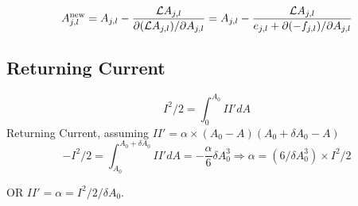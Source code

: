 \documentclass[aps,prd,preprint,groupedaddress]{revtex4-1}
\def\nn{\nonumber}
\def\beq{\begin{equation}}
\def\eeq{\end{equation}}
\def\WH{\Omega_{\rm H}}
\begin{document}
\beq
A_{j,l}^{\rm new }
= A_{j,l} - \frac{\mathcal L A_{j,l}}{\partial (\mathcal L A_{j,l})/\partial A_{j,l} }
= A_{j,l} - \frac{\mathcal L A_{j,l}}{e_{j,l} + \partial (- f_{j,l})/\partial A_{j,l} }
\eeq

%
%

\subsection{Returning Current}
\beq
I^2/2 = \int_0^{A_0} II' dA
\eeq
Returning Current, assuming $II' = \alpha \times (A_0 - A)(A_0+\delta A_0 -A)$
\beq
- I^2/2 = \int_{A_0}^{A_0 + \delta A_0} II' dA = -\frac{\alpha}{6} \delta A_0^3
\Rightarrow \alpha = (6/\delta A_0^3)\times I^2/2
\eeq

OR $II' = \alpha = I^2/2/\delta A_0$.
\end{document}
